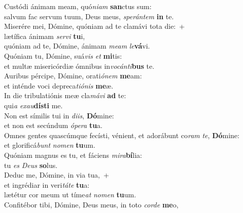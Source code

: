\evenverse Custódi ánimam meam, quó\textit{ni}\textit{am} \textbf{san}ctus sum:~\*\\
\evenverse salvum fac servum tuum, Deus meus, \textit{spe}\textit{rán}\textit{tem} \textbf{in} te.\\
\oddverse Miserére mei, Dómine, quóniam ad te clamávi tota die:~+\\
\oddverse  lætífica ánimam \textit{ser}\textit{vi} \textbf{tu}i,~\*\\
\oddverse quóniam ad te, Dómine, ánimam \textit{me}\textit{am} \textit{le}\textbf{vá}vi.\\
\evenverse Quóniam tu, Dómine, suá\textit{vis} \textit{et} \textbf{mi}tis:~\*\\
\evenverse et multæ misericórdiæ ómnibus in\textit{vo}\textit{cán}\textit{ti}\textbf{bus} te.\\
\oddverse Auribus pércipe, Dómine, orati\textit{ó}\textit{nem} \textbf{me}am:~\*\\
\oddverse et inténde voci depreca\textit{ti}\textit{ó}\textit{nis} \textbf{me}æ.\\
\evenverse In die tribulatiónis meæ cla\textit{má}\textit{vi} \textbf{ad} te:~\*\\
\evenverse qui\textit{a} \textit{e}\textit{xau}\textbf{dí}\textbf{sti} me.\\
\oddverse Non est símilis tui in \textit{di}\textit{is}, \textbf{Dó}mine:~\*\\
\oddverse et non est secúndum \textit{ó}\textit{pe}\textit{ra} \textbf{tu}a.\\
\evenverse Omnes gentes quascúmque fecísti, vénient, et adorábunt co\textit{ram} \textit{te}, \textbf{Dó}mine:~\*\\
\evenverse et glorificá\textit{bunt} \textit{no}\textit{men} \textbf{tu}um.\\
\oddverse Quóniam magnus es tu, et fáciens \textit{mi}\textit{ra}\textbf{bí}lia:~\*\\
\oddverse tu \textit{es} \textit{De}\textit{us} \textbf{so}lus.\\
\evenverse Deduc me, Dómine, in via tua,~+\\
\evenverse  et ingrédiar in veri\textit{tá}\textit{te} \textbf{tu}a:~\*\\
\evenverse lætétur cor meum ut tíme\textit{at} \textit{no}\textit{men} \textbf{tu}um.\\
\oddverse Confitébor tibi, Dómine, Deus meus, in toto \textit{cor}\textit{de} \textbf{me}o,~\*\\
